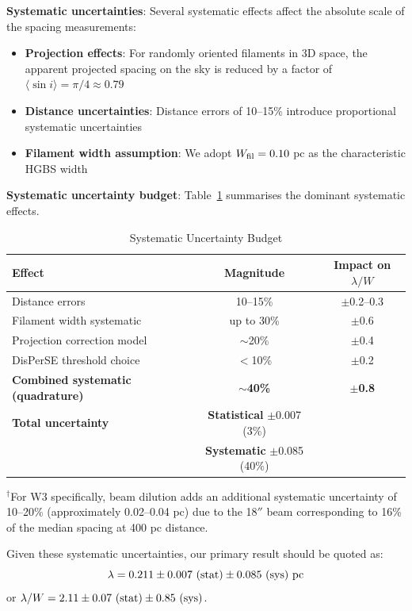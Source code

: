 \documentclass[11pt,a4paper]{article}
\begin{document}
\textbf{Systematic uncertainties}: Several systematic effects affect the absolute scale of the spacing measurements:
\begin{itemize}
    \item \textbf{Projection effects}: For randomly oriented filaments in 3D space, the apparent projected spacing on the sky is reduced by a factor of $\langle \sin i \rangle = \pi/4 \approx 0.79$
    \item \textbf{Distance uncertainties}: Distance errors of 10--15\% introduce proportional systematic uncertainties
    \item \textbf{Filament width assumption}: We adopt $W_{\rm fil} = 0.10$ pc as the characteristic HGBS width \citep{Arzoumanian2011}
\end{itemize}

\textbf{Systematic uncertainty budget}: Table~\ref{tab:uncertainties} summarises the dominant systematic effects.

\begin{table}[H]
\centering
\caption{Systematic Uncertainty Budget}
\label{tab:uncertainties}
\begin{tabular}{lcc}
\toprule
Effect & Magnitude & Impact on $\lambda/W$ \\
\midrule
Distance errors & 10--15\% & $\pm$0.2--0.3 \\
Filament width systematic & up to 30\% & $\pm$0.6 \\
Projection correction model & $\sim$20\% & $\pm$0.4 \\
DisPerSE threshold choice & $<$10\% & $\pm$0.2 \\
\textbf{Combined systematic (quadrature)} & \textbf{$\sim$40\%} & \textbf{$\pm$0.8} \\
\midrule
\textbf{Total uncertainty} & \textbf{Statistical} $\pm$0.007 (3\%) & \\
& \textbf{Systematic} $\pm$0.085 (40\%) & \\
\bottomrule
\end{tabular}
\vspace{-0.5em}
\small{$^{\dagger}$For W3 specifically, beam dilution adds an additional systematic uncertainty of 10--20\% (approximately 0.02--0.04 pc) due to the 18$''$ beam corresponding to 16\% of the median spacing at 400 pc distance.}
\end{table}

Given these systematic uncertainties, our primary result should be quoted as:
\begin{equation}
\lambda = 0.211 \pm 0.007~({\rm stat}) \pm 0.085~({\rm sys})~{\rm pc}
\end{equation}
or $\lambda/W = 2.11 \pm 0.07~({\rm stat}) \pm 0.85~({\rm sys})$.
\end{document}
